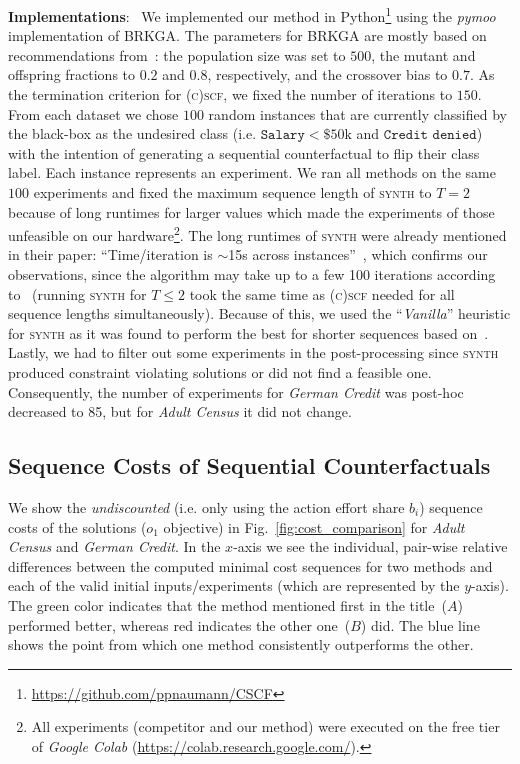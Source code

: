 \documentclass[runningheads, envcountsame, a4paper]{llncs}
\newcommand{\oursBoth}{\textsc{(c)scf}}
\newcommand{\competitor}{\textsc{synth}}
\newcommand{\adultDataset}{\emph{Adult Census}}
\newcommand{\germanDataset}{\emph{German Credit}}
\newcommand{\objective}{o}
\newcommand{\seqCosts}{\objective_{1}}
\newcommand{\baseCosts}{b}
\begin{document}
\textbf{Implementations}: \,
We implemented our method in Python\footnote{\url{https://github.com/ppnaumann/CSCF}} using the \emph{pymoo}~\cite{blankPymooMultiobjectiveOptimization2020} implementation of BRKGA.
The parameters for BRKGA are mostly based on recommendations from~\cite{goncalvesBiasedRandomkeyGenetic2011}: the population size was set to $500$, the mutant and offspring fractions to $0.2$ and $0.8$, respectively, and the crossover bias to $0.7$. 
As the termination criterion for \oursBoth{}, we fixed the number of iterations to $150$.
From each dataset we chose $100$ random instances that are currently classified by the black-box as the undesired class (i.e. $\texttt{Salary} < \$50\text{k}$ and $\texttt{Credit denied}$) with the intention of generating a sequential counterfactual to flip their class label. Each instance represents an experiment.
We ran all methods on the same $100$ experiments and fixed the maximum sequence length of \competitor{} to $T=2$ because of long runtimes for larger values which made the experiments of those unfeasible on our hardware\footnote{All experiments (competitor and our method) were executed on the free tier of \emph{Google Colab} (\url{https://colab.research.google.com/}).}.
The long runtimes of \competitor{} were already mentioned in their paper: \enquote{Time/iteration is $\sim$15s across instances}~\cite{ramakrishnanSynthesizingActionSequences2020}, which confirms our observations, since the algorithm may take up to a few 100 iterations according to~\cite{ramakrishnanSynthesizingActionSequences2020} (running \competitor{} for $T \leq 2$ took the same time as \oursBoth{} needed for all sequence lengths simultaneously). Because of this, we used the \enquote{\emph{Vanilla}} heuristic for \competitor{} as it was found to perform the best for shorter sequences based on~\cite{ramakrishnanSynthesizingActionSequences2020}.
Lastly, we had to filter out some experiments in the post-processing since \competitor{} produced constraint violating solutions or did not find a feasible one. Consequently, the number of experiments for \germanDataset{} was post-hoc decreased to 85, but for \adultDataset{} it did not change.

\subsection{Sequence Costs of Sequential Counterfactuals}
\label{sec:exp_competitor_minimal_costs}
We show the \emph{undiscounted} (i.e. only using the action effort share $\baseCosts_i$) sequence costs of the solutions ($\seqCosts$ objective) in Fig.~\ref{fig:cost_comparison} for \adultDataset{} and \germanDataset{}.
In the $x$-axis we see the individual, pair-wise relative differences between the computed minimal cost sequences for two methods and each of the valid initial inputs/experiments (which are represented by the $y$-axis).
The green color indicates that the method mentioned first in the title~($A$) performed better, whereas red indicates the other one~($B$) did.
The blue line shows the point from which one method consistently outperforms the other.
\end{document}
